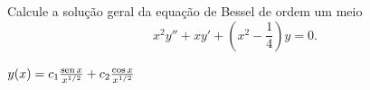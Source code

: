   \begin{exer}
    Calcule a solução geral da equação de Bessel de ordem um meio
    \begin{equation}
      x^2y'' + xy' + \left(x^2-\frac{1}{4}\right)y = 0.
    \end{equation}
  \end{exer}
  \begin{resp}
    $y(x) = c_1\frac{\operatorname{sen} x}{x^{1/2}} + c_2\frac{\cos x}{x^{1/2}}$
  \end{resp}
